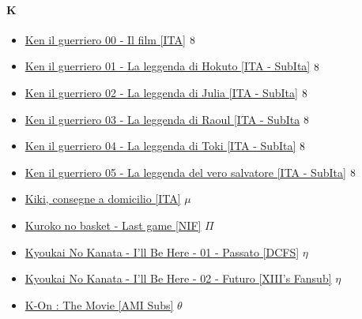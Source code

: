 		\paragraph{K} \hypertarget{FK}{}
			\begin{itemize}
				
				\item \href{https://mega.nz/#!bvBiFAib!0YXoRF9w3RJBIRXAk6AqnAvQ5-4rtW-ZB9JZwhcC4XI} {Ken il guerriero 00 - Il film [ITA]}  $\oldstylenums{8}$   \\
				\item \href{https://mega.nz/#!TmAAVIII!_z5VRTJB-TsqMnPGmh8mUFjOnXYPk-F7O2f26qM6mRw} {Ken il guerriero 01 - La leggenda di Hokuto [ITA - SubIta]}  $\oldstylenums{8}$   \\
				\item \href{https://mega.nz/#!aqBEnawD!3jcXeiuyPtTpsqeEP_ZIc9NiIzer3VQl2X80yyXZSgc} {Ken il guerriero 02 - La leggenda di Julia [ITA - SubIta]}  $\oldstylenums{8}$   \\
				\item \href{https://mega.nz/#!iiBQyaqK!Z5lo6B4q0Or3hMW3oWhntBNHhjVqhGYGDvdpLY58Zsg} {Ken il guerriero 03 - La leggenda di Raoul [ITA - SubIta}  $\oldstylenums{8}$   \\
				\item \href{https://mega.nz/#!TvAEDQTQ!qMK3oOKQRpuOaPuaV2NVefFEC2YQA8MGycM64dbOw9g} {Ken il guerriero 04 - La leggenda di Toki [ITA - SubIta]}  $\oldstylenums{8}$   \\
				\item \href{https://mega.nz/#!XnZAgIBT!eHSEXTFyvAnHPGpXCgXSBapee9zMSjX4dRzPVA9bFrg} {Ken il guerriero 05 - La leggenda del vero salvatore [ITA - SubIta]}  $\oldstylenums{8}$   \\
				\item \href{https://mega.nz/#!0kgjiQDA!nDBRmaL91TAWuT2pI31f8orADOTFBoNLEP60DEf3W4w} {Kiki, consegne a domicilio [ITA]}  $\mu$   \\
				\item \href{https://mega.nz/#!FepFEaib!OpGpIzC7HillJHUiBQREgKmAPZ5KmxTQcCE7Gjab60s} {Kuroko no basket - Last game [NIF]}  $\varPi$   \\
				\item \href{https://mega.nz/#!AEECFDpQ!4Ja8xYnqoi4mfonKt7Nl5EdfZWb2LLMLvYYUJeX0XEw} {Kyoukai No Kanata - I'll Be Here - 01 - Passato [DCFS]}  $\eta$   \\
				\item \href{https://mega.nz/#!kI92nawD!Brhf50MlvD8g9cEdgWGiTGKl_K8MVki9rBP4li0Xcto} {Kyoukai No Kanata - I'll Be Here - 02 - Futuro [XIII's Fansub]}  $\eta$   \\\item \href{https://mega.nz/#!po9FSbCK!yC7wocP01orVdvY5Sx3hOj2PH4tzZHVufV7FLR1D6As} {K-On : The Movie [AMI Subs]}  $\theta$   \\
			
		\end{itemize}	
			
